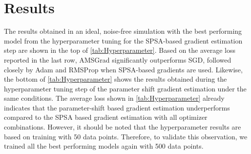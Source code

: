 \section{Results}
\label{sec:Results}

The results obtained in an ideal, noise-free simulation with the best performing model from the hyperparameter tuning for the SPSA-based gradient estimation step are shown in the top of \cref{tab:Hyperparameter}. Based on the average loss reported in the last row, AMSGrad significantly outperforms SGD, followed closely by Adam and RMSProp when SPSA-based gradients are used. Likewise, the bottom of \cref{tab:Hyperparameter} shows the results obtained during the hyperparameter tuning step of the parameter shift gradient estimation under the same conditions. The average loss shown in \cref{tab:Hyperparameter} already indicates that the parameter-shift based gradient estimation underperforms compared to the SPSA based gradient estimation with all optimizer combinations. However, it should be noted that the hyperparameter results are based on training with 50 data points. Therefore, to validate this observation, we trained all the best performing models again with 500 data points.

